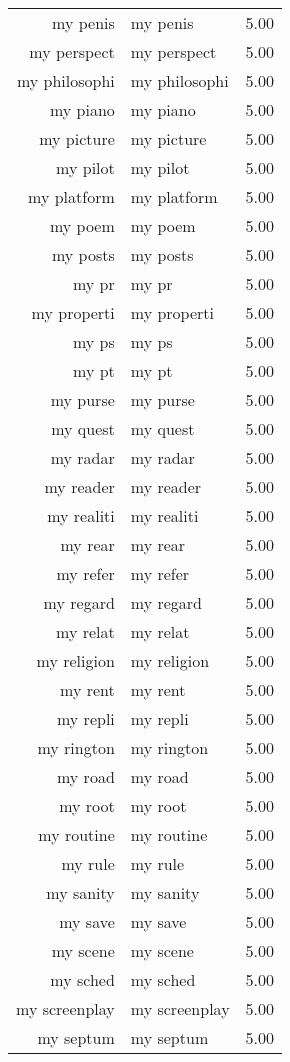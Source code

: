 \begin{table}[ht]
\begin{tabular}{rlr}
  my penis & my penis & 5.00 \\ 
  my perspect & my perspect & 5.00 \\ 
  my philosophi & my philosophi & 5.00 \\ 
  my piano & my piano & 5.00 \\ 
  my picture & my picture & 5.00 \\ 
  my pilot & my pilot & 5.00 \\ 
  my platform & my platform & 5.00 \\ 
  my poem & my poem & 5.00 \\ 
  my posts & my posts & 5.00 \\ 
  my pr & my pr & 5.00 \\ 
  my properti & my properti & 5.00 \\ 
  my ps & my ps & 5.00 \\ 
  my pt & my pt & 5.00 \\ 
  my purse & my purse & 5.00 \\ 
  my quest & my quest & 5.00 \\ 
  my radar & my radar & 5.00 \\ 
  my reader & my reader & 5.00 \\ 
  my realiti & my realiti & 5.00 \\ 
  my rear & my rear & 5.00 \\ 
  my refer & my refer & 5.00 \\ 
  my regard & my regard & 5.00 \\ 
  my relat & my relat & 5.00 \\ 
  my religion & my religion & 5.00 \\ 
  my rent & my rent & 5.00 \\ 
  my repli & my repli & 5.00 \\ 
  my rington & my rington & 5.00 \\ 
  my road & my road & 5.00 \\ 
  my root & my root & 5.00 \\ 
  my routine & my routine & 5.00 \\ 
  my rule & my rule & 5.00 \\ 
  my sanity & my sanity & 5.00 \\ 
  my save & my save & 5.00 \\ 
  my scene & my scene & 5.00 \\ 
  my sched & my sched & 5.00 \\ 
  my screenplay & my screenplay & 5.00 \\ 
  my septum & my septum & 5.00 \\ 

\end{tabular}
\end{table}
